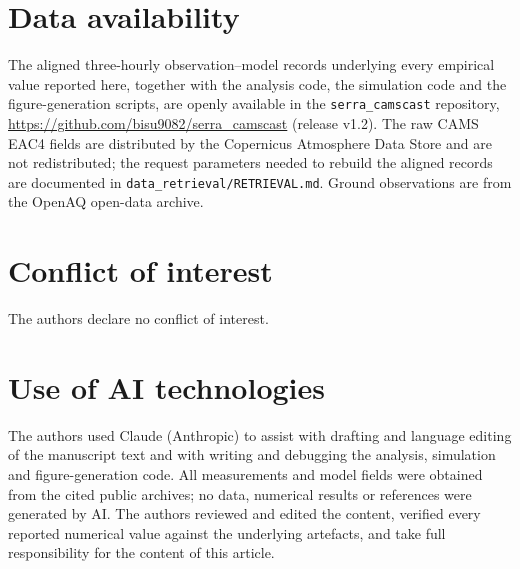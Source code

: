 \documentclass[12pt]{article}
\begin{document}
\section*{Data availability}
The aligned three-hourly observation--model records underlying every empirical value reported here,
together with the analysis code, the simulation code and the figure-generation scripts, are openly
available in the \texttt{serra\_camscast} repository,
\url{https://github.com/bisu9082/serra_camscast} (release v1.2). The raw CAMS EAC4 fields are
distributed by the Copernicus Atmosphere Data Store and are not redistributed; the request
parameters needed to rebuild the aligned records are documented in
\texttt{data\_retrieval/RETRIEVAL.md}. Ground observations are from the OpenAQ open-data archive.

\section*{Conflict of interest}
The authors declare no conflict of interest.

\section*{Use of AI technologies}
The authors used Claude (Anthropic) to assist with drafting and language editing of the
manuscript text and with writing and debugging the analysis, simulation and figure-generation
code. All measurements and model fields were obtained from the cited public archives; no data,
numerical results or references were generated by AI. The authors reviewed and edited the
content, verified every reported numerical value against the underlying artefacts, and take
full responsibility for the content of this article.

\clearpage
{\singlespacing

}

\end{document}
